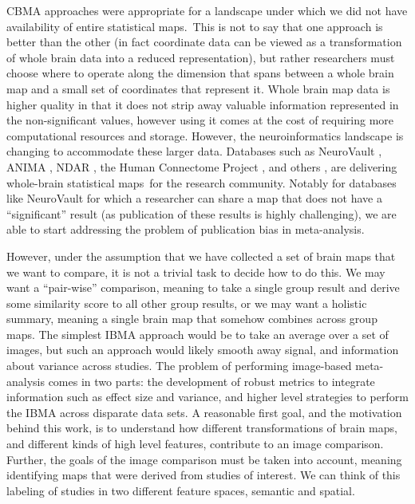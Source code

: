 \documentclass{report}
\begin{document}
CBMA approaches were appropriate for a landscape under which we did not
have availability of entire statistical maps.~This is not to say that
one approach is better than the other (in fact coordinate data can be
viewed as a transformation of whole brain data into a reduced
representation), but rather researchers must choose where to operate
along the dimension that spans between a whole brain map and a small set
of coordinates that represent it. Whole brain map data is higher quality
in that it does not strip away valuable information represented in the
non-significant values, however using it comes at the cost of requiring
more computational resources and storage. However, the neuroinformatics
landscape is changing to accommodate these larger data. Databases such
as NeuroVault \cite{Gorgolewski2015-gu}, ANIMA \cite{Reid2015-gt},
NDAR \cite{Hall2012-qo}, the Human Connectome Project \cite{Van_Essen2013-fi},
and others \cite{Book2016-ro,Landis2016-wo}, are delivering whole-brain
statistical maps~for the research community. Notably for databases like
NeuroVault for which a researcher can share a map that does not have a
``significant'' result (as publication of these results is highly
challenging), we are able to start addressing the problem of publication
bias in meta-analysis.

However, under the assumption that we have collected a set of brain maps
that we want to compare, it is not a trivial task to decide how to do
this. We may want a ``pair-wise'' comparison, meaning to take a single
group result and derive some similarity score to all other group
results, or we may want a holistic summary, meaning a single brain map
that somehow combines across group maps. The simplest IBMA approach
would be to take an average over a set of images, but such an approach
would likely smooth away signal, and information about variance across
studies. The problem of performing image-based meta-analysis comes in
two parts: the development of robust metrics to integrate information
such as effect size and variance, and higher level strategies to perform
the IBMA across disparate data sets. A reasonable first goal, and the
motivation behind this work, is to understand how different
transformations of brain maps, and different kinds of high level
features, contribute to an image comparison. Further, the goals of the
image comparison must be taken into account, meaning identifying maps
that were derived from studies of interest. We can think of this
labeling of studies in two different feature spaces, semantic and
spatial.
\end{document}
